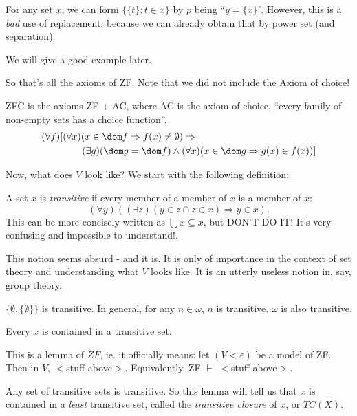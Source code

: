\documentclass[a4paper]{article}
\begin{document}
\begin{eg}
  For any set $x$, we can form $\{\{t\}: t\in x\}$ by $p$ being ``$y = \{x\}$''. However, this is a \emph{bad} use of replacement, because we can already obtain that by power set (and separation).

  We will give a good example later.
\end{eg}

So that's all the axioms of ZF. Note that we did not include the Axiom of choice!

\begin{defi}[ZFC]
  ZFC is the axioms ZF + AC, where AC is the axiom of choice, ``every family of non-empty sets has a choice function''.
  \begin{align*}
    (\forall f)[&(\forall x)(x\in \dom f \Rightarrow  f(x)\not= \emptyset) \Rightarrow  \\
    &\quad\quad(\exists g)(\dom g = \dom f) \wedge (\forall x)(x\in \dom g \Rightarrow  g(x) \in f(x))]
  \end{align*}
\end{defi}

Now, what does $V$ look like?  We start with the following definition:
\begin{defi}
  A set $x$ is \emph{transitive} if every member of a member of $x$ is a member of $x$:
  \[
    (\forall y)((\exists z)(y\in z\cap z\in x)\Rightarrow y \in x).
  \]
  This can be more concisely written as $\bigcup x \subseteq x$, but DON'T DO IT! It's very confusing and impossible to understand!.
\end{defi}
This notion seems absurd - and it is. It is only of importance in the context of set theory and understanding what $V$ looks like. It is an utterly useless notion in, say, group theory.

\begin{eg}
  $\{\emptyset, \{\emptyset\}\}$ is transitive. In general, for any $n\in \omega$, $n$ is transitive. $\omega$ is also transitive.
\end{eg}

\begin{lemma}
  Every $x$ is contained in a transitive set.
\end{lemma}
\note This is a lemma of $ZF$, ie. it officially means: let $(V< \varepsilon)$ be a model of ZF. Then in $V$, $<$stuff above$>$. Equivalently, ZF $\vdash$ $<$stuff above$>$.

\note Any set of transitive sets is transitive. So this lemma will tell us that $x$ is contained in a \emph{least} transitive set, called the \emph{transitive closure} of $x$, or $TC(X)$.
\end{document}
